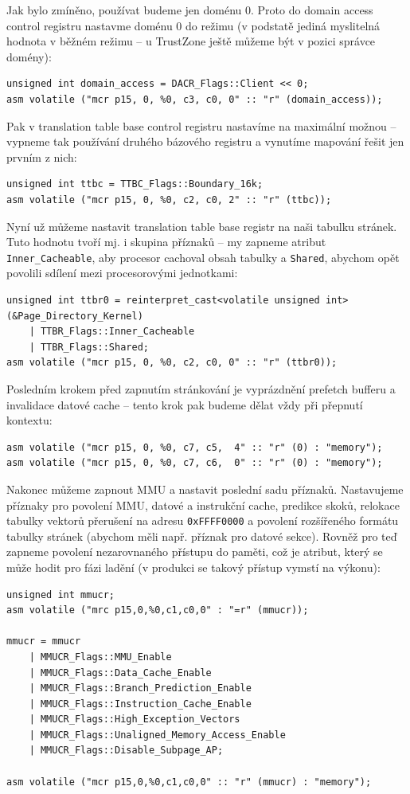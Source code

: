 \documentclass{article}
\begin{document}
Jak bylo zmíněno, používat budeme jen doménu 0. Proto do domain access control registru nastavme doménu 0 do režimu  (v podstatě jediná myslitelná hodnota v běžném režimu -- u TrustZone ještě můžeme být v pozici správce domény):
\begin{lstlisting}
unsigned int domain_access = DACR_Flags::Client << 0;
asm volatile ("mcr p15, 0, %0, c3, c0, 0" :: "r" (domain_access));
\end{lstlisting}

Pak v translation table base control registru nastavíme  na maximální možnou -- vypneme tak používání druhého bázového registru a vynutíme mapování řešit jen prvním z nich:
\begin{lstlisting}
unsigned int ttbc = TTBC_Flags::Boundary_16k;
asm volatile ("mcr p15, 0, %0, c2, c0, 2" :: "r" (ttbc));
\end{lstlisting}

Nyní už můžeme nastavit translation table base registr na naši tabulku stránek. Tuto hodnotu tvoří mj. i skupina příznaků -- my zapneme atribut \texttt{Inner\_Cacheable}, aby procesor cachoval obsah tabulky a \texttt{Shared}, abychom opět povolili sdílení mezi procesorovými jednotkami:
\begin{lstlisting}
unsigned int ttbr0 = reinterpret_cast<volatile unsigned int>(&Page_Directory_Kernel)
    | TTBR_Flags::Inner_Cacheable
    | TTBR_Flags::Shared;
asm volatile ("mcr p15, 0, %0, c2, c0, 0" :: "r" (ttbr0));
\end{lstlisting}

Posledním krokem před zapnutím stránkování je vyprázdnění prefetch bufferu a invalidace datové cache -- tento krok pak budeme dělat vždy při přepnutí kontextu:
\begin{lstlisting}
asm volatile ("mcr p15, 0, %0, c7, c5,  4" :: "r" (0) : "memory");
asm volatile ("mcr p15, 0, %0, c7, c6,  0" :: "r" (0) : "memory");
\end{lstlisting}

Nakonec můžeme zapnout MMU a nastavit poslední sadu příznaků. Nastavujeme příznaky pro povolení MMU, datové a instrukční cache, predikce skoků, relokace tabulky vektorů přerušení na adresu \texttt{0xFFFF0000} a povolení rozšířeného formátu tabulky stránek (abychom měli např. příznak  pro datové sekce). Rovněž pro teď zapneme povolení nezarovnaného přístupu do paměti, což je atribut, který se může hodit pro fázi ladění (v produkci se takový přístup vymstí na výkonu):
\begin{lstlisting}
unsigned int mmucr;
asm volatile ("mrc p15,0,%0,c1,c0,0" : "=r" (mmucr));

mmucr = mmucr
    | MMUCR_Flags::MMU_Enable
    | MMUCR_Flags::Data_Cache_Enable
    | MMUCR_Flags::Branch_Prediction_Enable
    | MMUCR_Flags::Instruction_Cache_Enable
    | MMUCR_Flags::High_Exception_Vectors
    | MMUCR_Flags::Unaligned_Memory_Access_Enable
    | MMUCR_Flags::Disable_Subpage_AP;

asm volatile ("mcr p15,0,%0,c1,c0,0" :: "r" (mmucr) : "memory");
\end{lstlisting}
\end{document}
